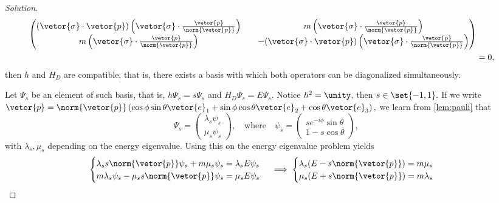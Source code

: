 \begin{proof}[Solution]
\begin{align*}
      \begin{pmatrix}
         (\vetor{\sigma}\cdot \vetor{p})\left(\vetor{\sigma}\cdot\frac{\vetor{p}}{\norm{\vetor{p}}}\right) && m \left(\vetor{\sigma}\cdot\frac{\vetor{p}}{\norm{\vetor{p}}}\right)\\
         m \left(\vetor{\sigma}\cdot\frac{\vetor{p}}{\norm{\vetor{p}}}\right) && - (\vetor{\sigma} \cdot \vetor{p})\left(\vetor{\sigma}\cdot\frac{\vetor{p}}{\norm{\vetor{p}}}\right)
      \end{pmatrix}\\
      &= 0,
   \end{align*}
   then \(h\) and \(H_D\) are compatible, that is, there exists a basis with which both operators can be diagonalized simultaneously.

   Let \(\Psi_s\) be an element of such basis, that is, \(h \Psi_s = s \Psi_s\) and \(H_D \Psi_s = E \Psi_s.\) Notice \(h^2 = \unity,\) then \(s \in \set{-1,1}.\) If we write \(\vetor{p} = \norm{\vetor{p}} \left(\cos\phi \sin\theta \vetor{e}_1 + \sin\phi\cos\theta \vetor{e}_2 + \cos\theta \vetor{e}_3\right),\) we learn from \cref{lem:pauli} that
   \begin{equation*}
      \Psi_s = \begin{pmatrix}
         \lambda_s \psi_s\\
         \mu_s \psi_s
      \end{pmatrix},
      \quad\text{where}\quad
      \psi_s = \begin{pmatrix}
         se^{-i\phi} \sin\theta\\
         1 - s \cos\theta
      \end{pmatrix},
   \end{equation*}
   with \(\lambda_s, \mu_s\) depending on the energy eigenvalue. Using this on the energy eigenvalue problem yields
   \begin{equation*}
      \begin{cases}
         \lambda_s s \norm{\vetor{p}} \psi_s + m \mu_s \psi_s = \lambda_s E \psi_s\\
         m \lambda_s  \psi_s  - \mu_s s  \norm{\vetor{p}} \psi_s =  \mu_s E \psi_s
      \end{cases}
      \implies
      \begin{cases}
         \lambda_s (E - s \norm{\vetor{p}}) = m \mu_s\\
         \mu_s (E + s \norm{\vetor{p}}) = m \lambda_s
      \end{cases}

\end{equation*}
\end{proof}
